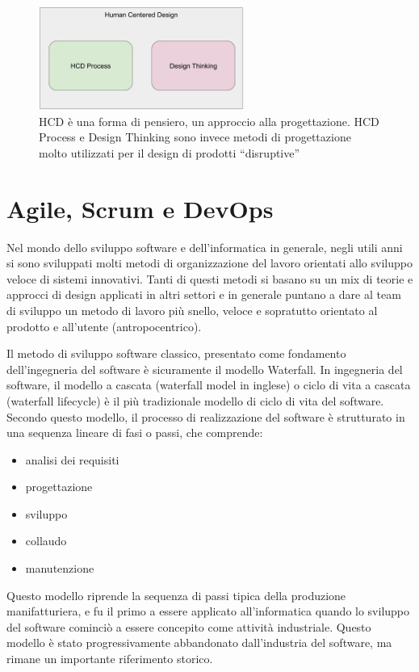\begin{figure}
	\centering
	\includegraphics[width=0.6\textwidth]{../immagini/dtvshcdp}
	\caption{HCD è una forma di pensiero, un approccio alla progettazione. HCD Process e Design Thinking sono invece metodi di progettazione molto utilizzati per il design di prodotti “disruptive”
}
\end{figure}

\section{Agile, Scrum e DevOps}
Nel mondo dello sviluppo software e dell'informatica in generale, negli utili anni si sono sviluppati molti metodi di organizzazione del lavoro orientati allo sviluppo veloce di sistemi innovativi. Tanti di questi metodi si basano su un mix di teorie e approcci di design applicati in altri settori e in generale puntano a dare al team di sviluppo un metodo di lavoro più snello, veloce e sopratutto orientato al prodotto e all'utente (antropocentrico).


Il metodo di sviluppo software classico, presentato come fondamento dell'ingegneria del software è sicuramente il modello Waterfall. In ingegneria del software, il modello a cascata (waterfall model in inglese) o ciclo di vita a cascata (waterfall lifecycle) è il più tradizionale modello di ciclo di vita del software. Secondo questo modello, il processo di realizzazione del software è strutturato in una sequenza lineare di fasi o passi, che comprende:

\begin{itemize}
    \item analisi dei requisiti
    \item progettazione
    \item sviluppo
    \item collaudo
    \item manutenzione

\end{itemize}

Questo modello riprende la sequenza di passi tipica della produzione manifatturiera, e fu il primo a essere applicato all'informatica quando lo sviluppo del software cominciò a essere concepito come attività industriale. Questo modello è stato progressivamente abbandonato dall'industria del software, ma rimane un importante riferimento storico.


